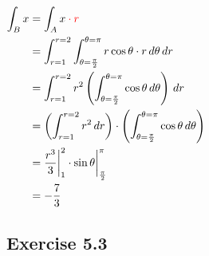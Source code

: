 $\begin{aligned}[t]
    \int_B x
     & = \int_A x \color{red} \cdot r                                                                             \\
     & = \int_{r=1}^{r=2} \int_{\theta=\frac{\pi}{2}}^{\theta=\pi} r \cos{\theta} \cdot r \,d\theta \,dr          \\
     & = \int_{r=1}^{r=2} r^2 \left( \int_{\theta=\frac{\pi}{2}}^{\theta=\pi} \cos{\theta} \,d\theta \right) \,dr \\
     & = \left( \int_{r=1}^{r=2} r^2 \,dr \right) \cdot\left( \int_{\theta=\frac{\pi}{2}}^{\theta=\pi} \cos{\theta} \,d\theta \right) \\
     & = \frac{r^3}{3} \bigg|_1^2 \cdot \sin{\theta} \bigg|_{\frac{\pi}{2}}^\pi                                   \\
     & = -\frac{7}{3}
\end{aligned}$

\subsection*{Exercise 5.3}